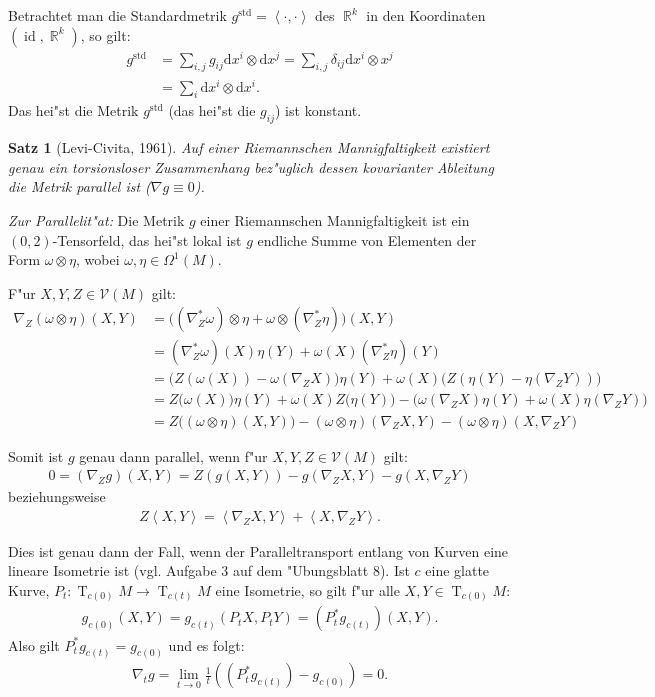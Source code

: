 \documentclass[paper=A4, twoside, chapterprefix=true, bibliography=totoc, headsepline]{scrbook}
\DeclareMathOperator{\R}{\mathbb{R}}
\DeclareMathOperator{\Id}{id}       %
\DeclareMathOperator{\T}{T}         %
\newcommand{\dop}{\mathrm{d}}
\theoremstyle{plain}
\newtheorem{Satz}[Dfn]{Satz}
\theoremstyle{nonumberplain}
\theoremstyle{empty}
\theoremstyle{break}
\begin{document}
Betrachtet man die Standardmetrik $g^{\text{std}} = \left<\cdot,\cdot\right>$ des $\R^k$ in den Koordinaten $(\Id, \R^k)$, so gilt:
\begin{align*}
  g^{\text{std}} & = \sum_{i,j} g_{ij} \dop x^i \otimes \dop x^j = \sum_{i,j} \delta_{ij} \dop x^i \otimes x^j\\
  & = \sum_i \dop x^i \otimes \dop x^i.
\end{align*}
Das hei"st die Metrik $g^{\text{std}}$ (das hei"st die $g_{ij}$) ist konstant.

\begin{Satz}[Levi-Civita, 1961] \label{satz-7-12}
  Auf einer Riemannschen Mannigfaltigkeit existiert genau ein torsionsloser Zusammenhang bez"uglich dessen kovarianter Ableitung die Metrik parallel ist ($\nabla g \equiv 0$).
\end{Satz}

\emph{Zur Parallelit"at:} Die Metrik $g$ einer Riemannschen Mannigfaltigkeit ist ein $(0,2)$-Tensorfeld, das hei"st lokal ist $g$ endliche Summe von Elementen der Form $\omega \otimes \eta$, wobei $\omega, \eta \in \Omega^1(M)$.

F"ur $X,Y,Z \in \mathcal V(M)$ gilt:
\begin{align*}
  \nabla_Z(\omega \otimes \eta)(X,Y) & = \big((\nabla^{*}_Z\omega) \otimes \eta + \omega \otimes (\nabla^{*}_Z \eta)\big)(X,Y)\\
  & = (\nabla^{*}_Z \omega)(X)\eta(Y) + \omega(X)(\nabla^{*}_Z \eta)(Y)\\
  & = \big(Z(\omega(X)) - \omega(\nabla_ZX)\big)\eta(Y) + \omega(X)\big(Z(\eta(Y)-\eta(\nabla_ZY))\big)\\
  & = Z\big(\omega(X)\big)\eta(Y) + \omega(X)Z\big(\eta(Y)\big) - \big(\omega(\nabla_ZX)\eta(Y) + \omega(X)\eta(\nabla_ZY)\big)\\
  & = Z\big((\omega \otimes \eta)(X,Y)\big) - (\omega \otimes \eta)(\nabla_ZX,Y) - (\omega \otimes \eta)(X,\nabla_Z Y)
\end{align*}

Somit ist $g$ genau dann parallel, wenn f"ur $X,Y,Z \in \mathcal V(M)$ gilt:
\begin{align*}
  0 = (\nabla_Z g)(X,Y) = Z(g(X,Y)) - g(\nabla_ZX,Y) - g(X,\nabla_ZY)
\end{align*}
beziehungsweise
\begin{align*}
  Z\left<X,Y\right> = \left<\nabla_ZX,Y\right> + \left<X,\nabla_ZY\right>.
\end{align*}

Dies ist genau dann der Fall, wenn der Paralleltransport entlang von Kurven eine lineare Isometrie ist (vgl. Aufgabe 3 auf dem "Ubungsblatt 8).
Ist $c$ eine glatte Kurve, $P_t \colon \T_{c(0)}M \to \T_{c(t)}M$ eine Isometrie, so gilt f"ur alle $X,Y \in \T_{c(0)}M$: 
\begin{align*}
  g_{c(0)}(X,Y) = g_{c(t)}(P_tX,P_tY) = (P^{*}_tg_{c(t)})(X,Y).
\end{align*}
Also gilt $P_t^{*} g_{c(t)} = g_{c(0)}$ und es folgt:
\begin{align*}
  \nabla_t g = \lim_{t \to 0}\frac{1}{t} \left( (P_t^{*}g_{c(t)}) - g_{c(0)} \right) = 0.
\end{align*}
\end{document}

